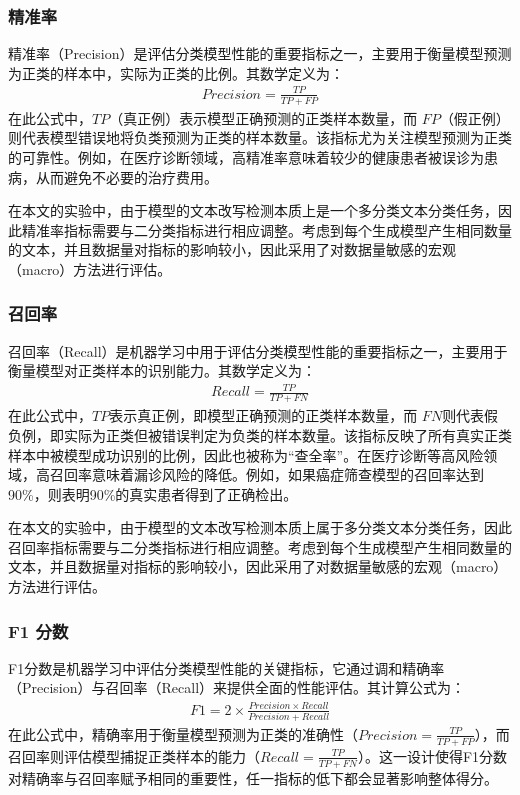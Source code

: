\subsubsection{精准率}

精准率（Precision）是评估分类模型性能的重要指标之一，主要用于衡量模型预测为正类的样本中，实际为正类的比例。其数学定义为：
\begin{align}
    Precision = \frac{TP}{TP+FP}
\end{align}
在此公式中，\(TP\)（真正例）表示模型正确预测的正类样本数量，而 \(FP\)（假正例）则代表模型错误地将负类预测为正类的样本数量。该指标尤为关注模型预测为正类的可靠性。例如，在医疗诊断领域，高精准率意味着较少的健康患者被误诊为患病，从而避免不必要的治疗费用。

在本文的实验中，由于模型的文本改写检测本质上是一个多分类文本分类任务，因此精准率指标需要与二分类指标进行相应调整。考虑到每个生成模型产生相同数量的文本，并且数据量对指标的影响较小，因此采用了对数据量敏感的宏观（macro）方法进行评估。

\subsubsection{召回率}

召回率（Recall）是机器学习中用于评估分类模型性能的重要指标之一，主要用于衡量模型对正类样本的识别能力。其数学定义为：
\begin{align}
    Recall = \frac{TP}{TP+FN}
\end{align}
在此公式中，\(TP\)表示真正例，即模型正确预测的正类样本数量，而 \(FN\)则代表假负例，即实际为正类但被错误判定为负类的样本数量。该指标反映了所有真实正类样本中被模型成功识别的比例，因此也被称为“查全率”。在医疗诊断等高风险领域，高召回率意味着漏诊风险的降低。例如，如果癌症筛查模型的召回率达到90\%，则表明90\%的真实患者得到了正确检出。

在本文的实验中，由于模型的文本改写检测本质上属于多分类文本分类任务，因此召回率指标需要与二分类指标进行相应调整。考虑到每个生成模型产生相同数量的文本，并且数据量对指标的影响较小，因此采用了对数据量敏感的宏观（macro）方法进行评估。

\subsubsection{F1 分数}

F1分数是机器学习中评估分类模型性能的关键指标，它通过调和精确率（Precision）与召回率（Recall）来提供全面的性能评估。其计算公式为：
\begin{align}
    F1 = 2 \times \frac{Precision \times Recall}{Precision + Recall}
\end{align}
在此公式中，精确率用于衡量模型预测为正类的准确性（\(Precision = \frac{TP}{TP + FP}\)），而召回率则评估模型捕捉正类样本的能力（\(Recall = \frac{TP}{TP + FN}\)）。这一设计使得F1分数对精确率与召回率赋予相同的重要性，任一指标的低下都会显著影响整体得分。

